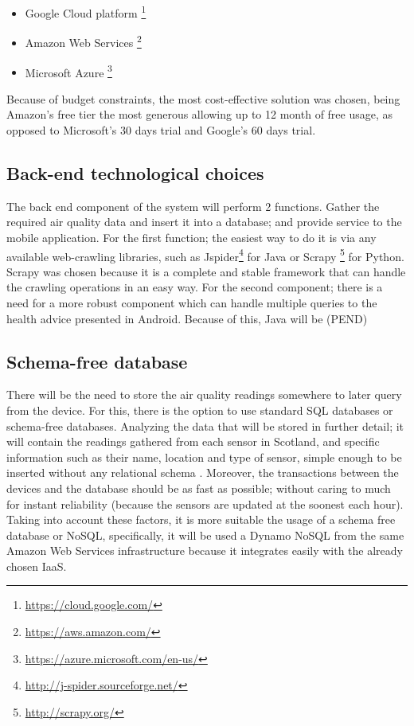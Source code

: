 \begin{itemize}
	\item Google Cloud platform \footnote{\url{https://cloud.google.com/}}
    \item Amazon Web Services \footnote{\url{https://aws.amazon.com/}}
    \item Microsoft Azure \footnote{\url{https://azure.microsoft.com/en-us/}}
\end{itemize}

Because of budget constraints, the most cost-effective solution was chosen, being Amazon's free tier the most generous allowing up to 12 month of free usage, as opposed to Microsoft's 30 days trial and Google's 60 days trial.

\subsection{Back-end technological choices}
The back end component of the system will perform 2 functions. Gather the required air quality data and insert it into a database; and provide service to the mobile application. For the  first function; the easiest way to do it is via any available web-crawling libraries, such as Jspider\footnote{\url{http://j-spider.sourceforge.net/}} for Java or Scrapy \footnote{\url{http://scrapy.org/}} for Python. Scrapy was chosen because it is a complete and stable framework that can handle the crawling operations in an easy way. 
For the second component; there is a need for a more robust component which can handle multiple queries to the health advice presented in Android. Because of this, Java will be (PEND)

\subsection{Schema-free database}
There will be the need to store the air quality readings somewhere to later query from the device. For this, there is the option to use standard SQL databases or schema-free databases. Analyzing the data that will be stored in further detail; it will contain the readings gathered from each sensor in Scotland, and specific information such as their name, location and type of sensor, simple enough to be inserted without any relational schema . Moreover, the transactions between the devices and the database should be as fast as possible; without caring to much for instant reliability (because the sensors are updated at the soonest each hour). Taking into account these factors, it is more suitable the usage of a schema free database or NoSQL, specifically, it will be used a Dynamo NoSQL from the same Amazon Web Services infrastructure because it integrates easily with the already chosen IaaS. 

